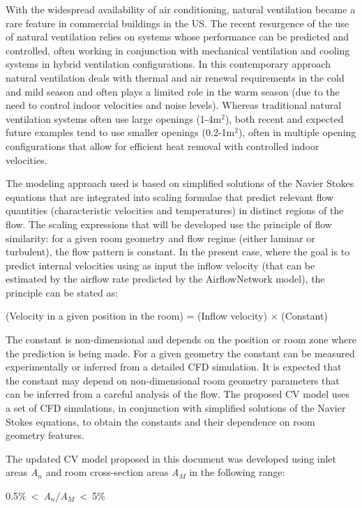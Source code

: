 With the widespread availability of air conditioning, natural ventilation became a rare feature in commercial buildings in the US. The recent resurgence of the use of natural ventilation relies on systems whose performance can be predicted and controlled, often working in conjunction with mechanical ventilation and cooling systems in hybrid ventilation configurations. In this contemporary approach natural ventilation deals with thermal and air renewal requirements in the cold and mild season and often plays a limited role in the warm season (due to the need to control indoor velocities and noise levels). Whereas traditional natural ventilation systems often use large openings (1-4m\(^{2}\)), both recent and expected future examples tend to use smaller openings (0.2-1m\(^{2}\)), often in multiple opening configurations that allow for efficient heat removal with controlled indoor velocities.

The modeling approach used is based on simplified solutions of the Navier Stokes equations that are integrated into scaling formulae that predict relevant flow quantities (characteristic velocities and temperatures) in distinct regions of the flow. The scaling expressions that will be developed use the principle of flow similarity: for a given room geometry and flow regime (either laminar or turbulent), the flow pattern is constant. In the present case, where the goal is to predict internal velocities using as input the inflow velocity (that can be estimated by the airflow rate predicted by the AirflowNetwork model), the principle can be stated as:

(Velocity in a given position in the room) = (Inflow velocity) × (Constant)

The constant is non-dimensional and depends on the position or room zone where the prediction is being made. For a given geometry the constant can be measured experimentally or inferred from a detailed CFD simulation. It is expected that the constant may depend on non-dimensional room geometry parameters that can be inferred from a careful analysis of the flow. The proposed CV model uses a set of CFD simulations, in conjunction with simplified solutions of the Navier Stokes equations, to obtain the constants and their dependence on room geometry features.

The updated CV model proposed in this document was developed using inlet areas \emph{A}\(_{n}\) and room cross-section areas \emph{A}\(_{M}\) in the following range:

0.5\%~\textless{}~\emph{A}\(_{n}\)/\emph{A}\(_{M}\)~\textless{}~5\%

